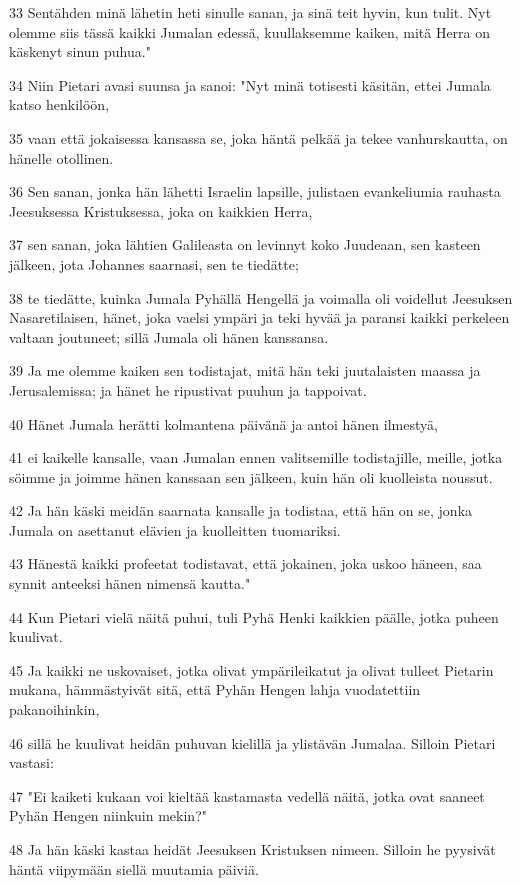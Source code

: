 \par 33 Sentähden minä lähetin heti sinulle sanan, ja sinä teit hyvin, kun tulit. Nyt olemme siis tässä kaikki Jumalan edessä, kuullaksemme kaiken, mitä Herra on käskenyt sinun puhua."
\par 34 Niin Pietari avasi suunsa ja sanoi: "Nyt minä totisesti käsitän, ettei Jumala katso henkilöön,
\par 35 vaan että jokaisessa kansassa se, joka häntä pelkää ja tekee vanhurskautta, on hänelle otollinen.
\par 36 Sen sanan, jonka hän lähetti Israelin lapsille, julistaen evankeliumia rauhasta Jeesuksessa Kristuksessa, joka on kaikkien Herra,
\par 37 sen sanan, joka lähtien Galileasta on levinnyt koko Juudeaan, sen kasteen jälkeen, jota Johannes saarnasi, sen te tiedätte;
\par 38 te tiedätte, kuinka Jumala Pyhällä Hengellä ja voimalla oli voidellut Jeesuksen Nasaretilaisen, hänet, joka vaelsi ympäri ja teki hyvää ja paransi kaikki perkeleen valtaan joutuneet; sillä Jumala oli hänen kanssansa.
\par 39 Ja me olemme kaiken sen todistajat, mitä hän teki juutalaisten maassa ja Jerusalemissa; ja hänet he ripustivat puuhun ja tappoivat.
\par 40 Hänet Jumala herätti kolmantena päivänä ja antoi hänen ilmestyä,
\par 41 ei kaikelle kansalle, vaan Jumalan ennen valitsemille todistajille, meille, jotka söimme ja joimme hänen kanssaan sen jälkeen, kuin hän oli kuolleista noussut.
\par 42 Ja hän käski meidän saarnata kansalle ja todistaa, että hän on se, jonka Jumala on asettanut elävien ja kuolleitten tuomariksi.
\par 43 Hänestä kaikki profeetat todistavat, että jokainen, joka uskoo häneen, saa synnit anteeksi hänen nimensä kautta."
\par 44 Kun Pietari vielä näitä puhui, tuli Pyhä Henki kaikkien päälle, jotka puheen kuulivat.
\par 45 Ja kaikki ne uskovaiset, jotka olivat ympärileikatut ja olivat tulleet Pietarin mukana, hämmästyivät sitä, että Pyhän Hengen lahja vuodatettiin pakanoihinkin,
\par 46 sillä he kuulivat heidän puhuvan kielillä ja ylistävän Jumalaa. Silloin Pietari vastasi:
\par 47 "Ei kaiketi kukaan voi kieltää kastamasta vedellä näitä, jotka ovat saaneet Pyhän Hengen niinkuin mekin?"
\par 48 Ja hän käski kastaa heidät Jeesuksen Kristuksen nimeen. Silloin he pyysivät häntä viipymään siellä muutamia päiviä.

